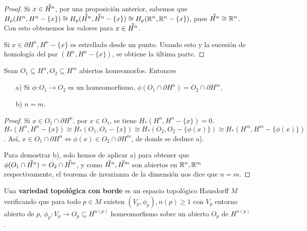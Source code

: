 \begin{proof}
  Si $x \in \interior{H^n}$, por una proposición anterior, sabemos que
  $H_p(H^n, H^n - \{x\}) \cong H_p(\interior{H^n}, \interior{H^n} - \{x\}) \cong H_p(\R^n, \R^n - \{x\})$, pues
  $\interior{H^n} \cong \R^n$. Con esto obtenemos los valores para $x \in \interior{H^n}$.

  Si $x \in \partial H^n, H^n - \{x\}$ es estrellado desde un punto. Usando esto y la sucesión de homología del par $(H^n, H^n - \{x\})$,
  se obtiene la última parte.
\end{proof}

\begin{corollary}
  Sean $O_1 \subseteq H^n, O_2 \subseteq H^m$ abiertos homeomorfos. Entonces
  \begin{itemize}
    \item [a)] Si $\phi \colon O_1 \to O_2$ es un homeomorfismo, $\phi(O_1 \cap \partial H^n) = O_2 \cap \partial H^m$,
    \item [b)] $n = m$.
  \end{itemize}
\end{corollary}

\begin{proof}
  Si $x \in O_1 \cap \partial H^n$, por $x \in O_1$, se tiene $H_*(H^n, H^n - \{x\}) = 0$. \\
  $H_*(H^n, H^n - \{x\}) \cong H_*(O_1, O_1 - \{x\}) \cong H_*(O_2, O_2 - \{\phi(x)\}) \cong H_*(H^m, H^m - \{\phi(x)\})$.
  Así, $x \in O_1 \cap \partial H^n \iff \phi(x) \in O_2 \cap \partial H^m$, de donde se deduce a).

  Para demostrar b), solo hemos de aplicar a) para obtener que $\phi(O_1 \cap \interior{H^n}) = O_2 \cap \interior{H^m}$, y como
  $\interior{H^n}, \interior{H^m}$ son abiertos en $\mathbb{R}^n, \mathbb{R}^m$ respectivamente, el teorema de invarianza de la dimensión
  nos dice que $n = m$.
\end{proof}

\begin{definition}
  Una \textbf{variedad topológica con borde} es un espacio topológico Hausdorff $M$ verificando que para todo $p \in M$ existen
  $(V_p, \phi_p), n(p) \geq 1$ con $V_p$ entorno abierto de $p$, $\phi_p \colon V_p \to O_p \subseteq H^{n(p)}$ homeomorfismo
  sobre un abierto $O_p$ de $H^{n(p)}$.
\end{definition}

